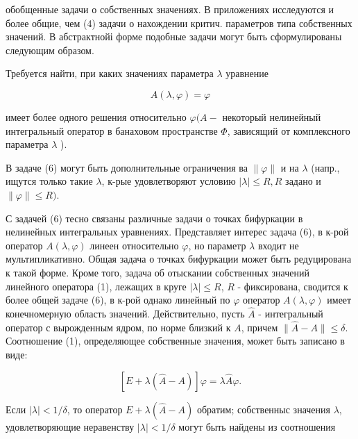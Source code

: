 \documentclass[10pt]{article}
\begin{document}
обобщенные задачи о собственных значениях. В приложениях исследуются и более общие, чем (4) задачи о нахождении критич. параметров типа собственных значений. В абстрактнойі форме подобные задачи могут быть сформулированы следующим образом.



Требуется найти, при каких значениях параметра $\lambda$ уравнение



\[

A(\lambda, \varphi)=\varphi

\]



имеет более одного решения относительно $\varphi(A-$ некоторый нелинейный интегральный оператор в банаховом пространстве $\Phi$, зависящий от комплексного параметра $\lambda$ ).



В задаче (6) могут быть дополнительные ограничения ва $\|\varphi\|$ и на $\lambda$ (напр., ищутся только такие $\lambda$, к-рые удовлетворяют условию $|\lambda| \leqslant R, R$ задано и $\|\varphi\| \leqslant R)$.



С задачей (6) тесно связаны различные задачи о точках бифуркации в нелинейных интегральных уравнениях. Представляет интерес задача (6), в к-рой оператор $A(\lambda, \varphi)$ линеен относительно $\varphi$, но параметр $\lambda$ входит не мультипликативно. Общая задача о точках бифуркации может быть редуцирована к такой форме. Кроме того, задача об отыскании собственных значений линейного оператора (1), лежащих в круге $|\lambda| \leqslant R$, $R$ - фиксирована, сводится к более общей задаче (6), в к-рой однако линейный по $\varphi$ оператор $A(\lambda, \varphi)$ имеет конечномерную область значений. Действительно, пусть $\widehat{A}$ - интегральный оператор с вырожденным ядром, по норме близкий к $A$, причем $\|\widehat{A}-A\| \leqslant \delta$. Соотношение (1), определяющее собственные значения, может быть записано в виде:



\[

[E+\lambda(\hat{A}-A)] \varphi=\lambda \hat{A} \varphi .

\]



Если $|\lambda|<1 / \delta$, то оператор $E+\lambda(\hat{A}-A)$ обратим; собственныс значения $\lambda$, удовлетворяющие неравенству $|\lambda|<1 / \delta$ могут быть найдены из соотношения
\end{document}
